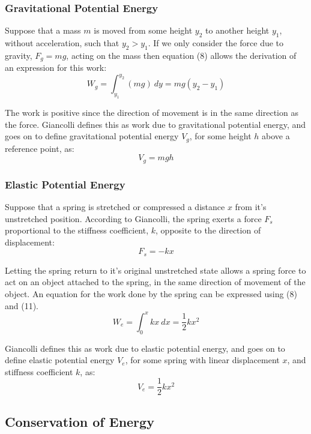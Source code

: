 \documentclass[a4paper]{article}
\begin{document}
\subsubsection{Gravitational Potential Energy}
Suppose that a mass $m$ is moved from some height $y_2$ to another height $y_1$, without acceleration, such that $y_2 > y_1$. If we only consider the force due to gravity, $F_g = mg$, acting on the mass then equation (8) allows the derivation of an expression for this work:
\begin{equation}
W_g = \int_{y_1}^{y_2} (mg) \ dy = mg(y_2 - y_1)
\end{equation}

The work is positive since the direction of movement is in the same direction as the force. Giancolli defines this as work due to gravitational potential energy, and goes on to define gravitational potential energy $V_g$, for some height $h$ above a reference point, as:
\begin{equation}
V_g = mgh
\end{equation}

\subsubsection{Elastic Potential Energy}
Suppose that a spring is stretched or compressed a distance $x$ from it's unstretched position. According to Giancolli, the spring exerts a force $F_s$ proportional to the stiffness coefficient, $k$, opposite to the direction of displacement:
\begin{equation}
F_s = -kx
\end{equation}

Letting the spring return to it's original unstretched state allows a spring force to act on an object attached to the spring, in the same direction of movement of the object. An equation for the work done by the spring can be expressed using (8) and (11).
\begin{equation}
W_e = \int_{0}^{x} kx \ dx = \frac{1}{2}kx^2
\end{equation}

Giancolli defines this as work due to elastic potential energy, and goes on to define elastic potential energy $V_e$, for some spring with linear displacement $x$, and stiffness coefficient $k$, as:
\begin{equation}
V_e = \frac{1}{2}kx^2
\end{equation}

\subsection{Conservation of Energy}
\end{document}
